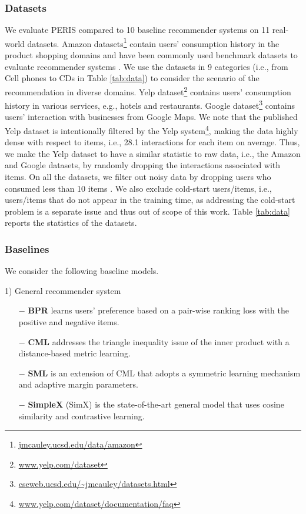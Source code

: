 \documentclass[sigconf]{acmart}
\newcommand{\MD}{{\small\textsf{PERIS}}}
\begin{document}
\subsubsection{\textbf{Datasets}}
We evaluate \MD{} compared to 10 baseline recommender systems on 11 real-world datasets. Amazon datasets\footnote{\url{jmcauley.ucsd.edu/data/amazon}} contain users' consumption history in the product shopping domains and have been commonly used benchmark datasets to evaluate recommender systems \cite{ma2019hierarchical,mao2021simplex}. We use the datasets in 9 categories (i.e., from Cell phones to CDs in Table \ref{tab:data}) to consider the scenario of the recommendation in diverse domains. Yelp dataset\footnote{\url{www.yelp.com/dataset}} contains users' consumption history in various services, e.g., hotels and restaurants.
Google dataset\footnote{\url{cseweb.ucsd.edu/~jmcauley/datasets.html}} contains users' interaction with businesses from Google Maps.
We note that the published Yelp dataset is intentionally filtered by the Yelp system\footnote{\url{www.yelp.com/dataset/documentation/faq}}, making the data highly dense with respect to items, i.e., 28.1 interactions for each item on average. Thus, we make the Yelp dataset to have a similar statistic to raw data, i.e., the Amazon and Google datasets, by randomly dropping the interactions associated with items.  
On all the datasets, we filter out noisy data by dropping users who consumed less than 10 items \cite{hsieh2017collaborative,tang2018personalized,li2020symmetric}. 
We also exclude cold-start users/items, i.e., users/items that do not appear in the training time, as addressing the cold-start problem is a separate issue \cite{volkovs2017content,elkahky2015multi} and thus out of scope of this work.
Table \ref{tab:data} reports the statistics of the datasets. 
\subsubsection{\textbf{Baselines}}
We consider the following baseline models. 


1) General recommender system
\begin{itemize}
    \item[$-$] \textbf{BPR} \cite{rendle2012bpr} learns users' preference based on a pair-wise ranking loss with the positive and negative items.
    \item[$-$] \textbf{CML} \cite{hsieh2017collaborative}  addresses the triangle inequality issue of the inner product with a distance-based metric learning.
    \item[$-$] \textbf{SML} \cite{li2020symmetric} is an extension of CML that adopts a symmetric learning mechanism and adaptive margin parameters.
    \item[$-$] \textbf{SimpleX} (SimX) \cite{mao2021simplex} is the state-of-the-art general model that uses cosine similarity and contrastive learning.
\end{itemize}
\end{document}
